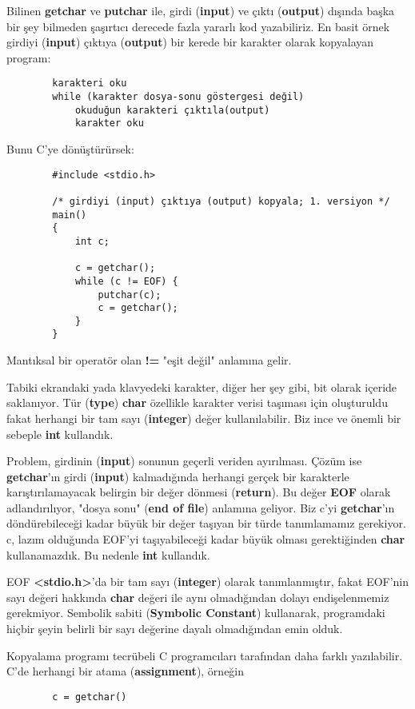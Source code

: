 \documentclass[a4paper,12pt,oneside]{book}
\begin{document}
Bilinen \textbf{getchar} ve \textbf{putchar} ile, girdi (\textbf{input}) ve çıktı (\textbf{output}) dışında başka bir şey bilmeden şaşırtıcı derecede fazla yararlı kod yazabiliriz. En basit örnek girdiyi (\textbf{input}) çıktıya (\textbf{output}) bir kerede bir karakter olarak kopyalayan program:
\begin{lstlisting}
		karakteri oku
		while (karakter dosya-sonu göstergesi değil)
			okuduğun karakteri çıktıla(output)
			karakter oku
\end{lstlisting}
Bunu C'ye dönüştürürsek:
\begin{lstlisting}
		#include <stdio.h>

		/* girdiyi (input) çıktıya (output) kopyala; 1. versiyon */
		main()
		{
			int c;

			c = getchar();
			while (c != EOF) {
				putchar(c);
				c = getchar();
			}
		}
\end{lstlisting}
Mantıksal bir operatör olan \textbf{ !=} "eşit değil" anlamına gelir.
\par Tabiki ekrandaki yada klavyedeki karakter, diğer her şey gibi, bit olarak içeride saklanıyor. Tür (\textbf{type}) \textbf{char} özellikle karakter verisi taşıması için oluşturuldu fakat herhangi bir tam sayı (\textbf{integer}) değer kullanılabilir. Biz ince ve önemli bir sebeple \textbf{int} kullandık.
\par Problem, girdinin (\textbf{input}) sonunun geçerli veriden ayırılması. Çözüm ise \textbf{getchar}'ın girdi (\textbf{input}) kalmadığında herhangi gerçek bir karakterle karıştırılamayacak belirgin bir değer dönmesi (\textbf{return}). Bu değer \textbf{EOF} olarak adlandırılıyor, "dosya sonu" (\textbf{end of file}) anlamına geliyor. Biz c'yi \textbf{getchar}'ın döndürebileceği kadar büyük bir değer taşıyan bir türde tanımlamamız gerekiyor. c, lazım olduğunda EOF'yi taşıyabileceği kadar büyük olması gerektiğinden \textbf{char} kullanamazdık. Bu nedenle \textbf{int} kullandık.
\par EOF \textbf{<stdio.h>}'da bir tam sayı (\textbf{integer}) olarak tanımlanmıştır, fakat EOF'nin sayı değeri hakkında \textbf{char} değeri ile aynı olmadığından dolayı endişelenmemiz gerekmiyor. Sembolik sabiti (\textbf{Symbolic Constant}) kullanarak, programdaki hiçbir şeyin belirli bir sayı değerine dayalı olmadığından emin olduk.
\par Kopyalama programı tecrübeli C programcıları tarafından daha farklı yazılabilir. C'de herhangi bir atama (\textbf{assignment}), örneğin
\begin{lstlisting}
		c = getchar()
\end{lstlisting}
\end{document}
